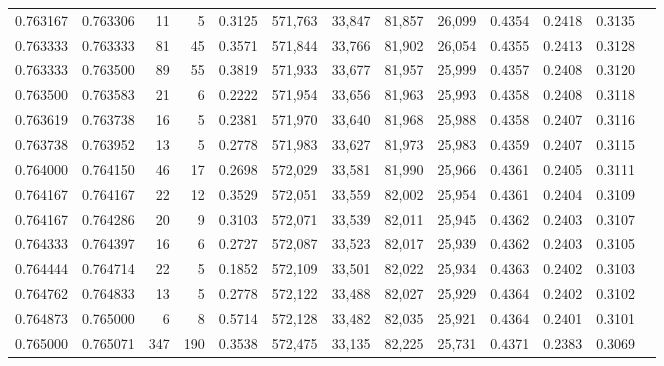 \begin{tabular}{rrrrrrrrrrrrr}
0.763167 & 0.763306 &    11 &   5 &                                     0.3125 & 571,763 &  33,847 &  81,857 &  26,099 & 0.4354 & 0.2418 & 0.3135 \\
0.763333 & 0.763333 &    81 &  45 &                                     0.3571 & 571,844 &  33,766 &  81,902 &  26,054 & 0.4355 & 0.2413 & 0.3128 \\
0.763333 & 0.763500 &    89 &  55 &                                     0.3819 & 571,933 &  33,677 &  81,957 &  25,999 & 0.4357 & 0.2408 & 0.3120 \\
0.763500 & 0.763583 &    21 &   6 &                                     0.2222 & 571,954 &  33,656 &  81,963 &  25,993 & 0.4358 & 0.2408 & 0.3118 \\
0.763619 & 0.763738 &    16 &   5 &                                     0.2381 & 571,970 &  33,640 &  81,968 &  25,988 & 0.4358 & 0.2407 & 0.3116 \\
0.763738 & 0.763952 &    13 &   5 &                                     0.2778 & 571,983 &  33,627 &  81,973 &  25,983 & 0.4359 & 0.2407 & 0.3115 \\
0.764000 & 0.764150 &    46 &  17 &                                     0.2698 & 572,029 &  33,581 &  81,990 &  25,966 & 0.4361 & 0.2405 & 0.3111 \\
0.764167 & 0.764167 &    22 &  12 &                                     0.3529 & 572,051 &  33,559 &  82,002 &  25,954 & 0.4361 & 0.2404 & 0.3109 \\
0.764167 & 0.764286 &    20 &   9 &                                     0.3103 & 572,071 &  33,539 &  82,011 &  25,945 & 0.4362 & 0.2403 & 0.3107 \\
0.764333 & 0.764397 &    16 &   6 &                                     0.2727 & 572,087 &  33,523 &  82,017 &  25,939 & 0.4362 & 0.2403 & 0.3105 \\
0.764444 & 0.764714 &    22 &   5 &                                     0.1852 & 572,109 &  33,501 &  82,022 &  25,934 & 0.4363 & 0.2402 & 0.3103 \\
0.764762 & 0.764833 &    13 &   5 &                                     0.2778 & 572,122 &  33,488 &  82,027 &  25,929 & 0.4364 & 0.2402 & 0.3102 \\
0.764873 & 0.765000 &     6 &   8 &                                     0.5714 & 572,128 &  33,482 &  82,035 &  25,921 & 0.4364 & 0.2401 & 0.3101 \\
0.765000 & 0.765071 &   347 & 190 &                                     0.3538 & 572,475 &  33,135 &  82,225 &  25,731 & 0.4371 & 0.2383 & 0.3069 \\

\end{tabular}
